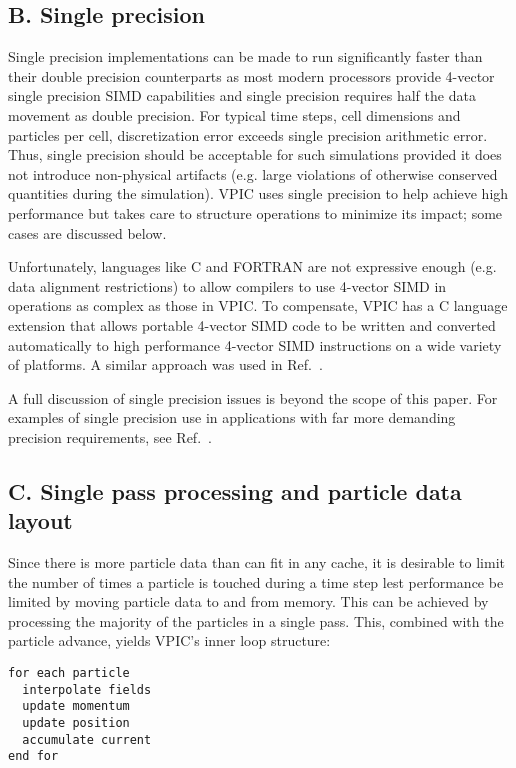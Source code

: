 \documentclass[letter,10pt]{article}
\begin{document}
\subsection{B. Single precision}

Single precision implementations can be made to run significantly
faster than their double precision counterparts as most modern
processors provide 4-vector single precision SIMD capabilities and
single precision requires half the data movement as double precision.
For typical time steps, cell dimensions and particles per cell,
discretization error exceeds single precision arithmetic error.  Thus,
single precision should be acceptable for such simulations provided it
does not introduce non-physical artifacts (e.g. large violations of
otherwise conserved quantities during the simulation).  VPIC uses
single precision to help achieve high performance but takes care to
structure operations to minimize its impact; some cases are discussed
below.

Unfortunately, languages like C and FORTRAN are not expressive enough
(e.g. data alignment restrictions) to allow compilers to use 4-vector
SIMD in operations as complex as those in VPIC.  To compensate, VPIC
has a C language extension that allows portable 4-vector SIMD code to
be written and converted automatically to high performance 4-vector
SIMD instructions on a wide variety of platforms.  A similar approach
was used in Ref.~\cite{Bowers_et_al_2006}.

A full discussion of single precision issues is beyond the scope of
this paper.  For examples of single precision use in applications with
far more demanding precision requirements, see
Ref.~\cite{Bowers_et_al_2006,Lippert_et_al_2007}.

\subsection{C. Single pass processing and particle data layout}

Since there is more particle data than can fit in any cache, it is
desirable to limit the number of times a particle is touched during a
time step lest performance be limited by moving particle data to and
from memory.  This can be achieved by processing the majority of the
particles in a single pass.  This, combined with the particle advance,
yields VPIC's inner loop structure:
\begin{verbatim}
for each particle
  interpolate fields
  update momentum
  update position
  accumulate current
end for
\end{verbatim}
\end{document}
